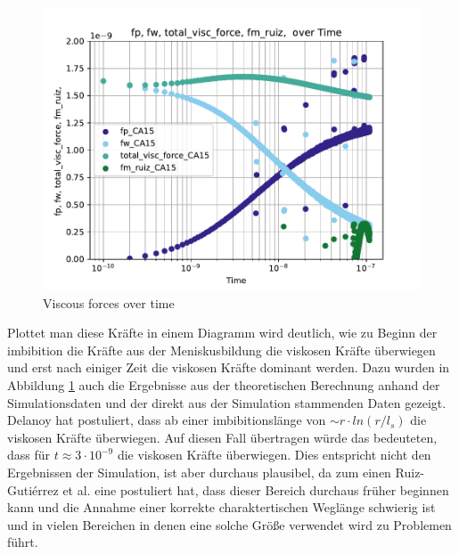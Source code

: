 \begin{figure}[h]
    \centering
    \includegraphics[width=.95\textwidth]{Pictures/log_fp_fw_total_visc_force_fm_ruiz_overTime.pdf}
    \caption{Viscous forces over time}
    \label{fig: forcesOverTime}
\end{figure}




Plottet man diese Kräfte in einem Diagramm wird deutlich, wie zu Beginn der imbibition die Kräfte aus der Meniskusbildung die viskosen Kräfte überwiegen und erst nach einiger Zeit die viskosen Kräfte dominant werden. Dazu wurden in Abbildung \ref*{fig: forcesOverTime} auch die Ergebnisse aus der theoretischen Berechnung anhand der Simulationsdaten und der direkt aus der Simulation stammenden Daten gezeigt. Delanoy hat postuliert, dass ab einer imbibitionslänge von $\sim r\cdot ln(r/l_s)$ die viskosen Kräfte überwiegen. Auf diesen Fall übertragen würde das bedeuteten, dass für $t\approx 3\cdot 10^{-9}$ die viskosen Kräfte überwiegen. Dies entspricht nicht den Ergebnissen der Simulation, ist aber durchaus plausibel, da zum einen Ruiz-Gutiérrez et al. \cite{ruiz2019CapillaryRise} eine postuliert hat, dass dieser Bereich durchaus früher beginnen kann und die Annahme einer korrekte charaktertischen Weglänge schwierig ist und in vielen Bereichen in denen eine solche Größe verwendet wird zu Problemen führt. 



